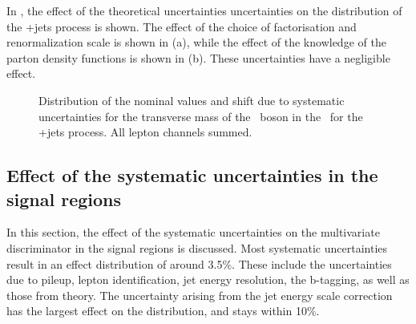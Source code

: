 \newpage
In , the effect of the theoretical uncertainties uncertainties on the distribution of the \WZ+jets process is shown. The effect of the choice of factorisation and renormalization scale is shown in  (a), while the effect of the knowledge of the parton density functions is shown in  (b). These uncertainties have a negligible effect. 
\begin{figure}[htbp] 
	\centering 

	\caption{Distribution of the nominal values and shift due to  systematic uncertainties for the transverse mass of the \PW\ boson in the \WZCR\ for the \WZ+jets process. All lepton channels summed.}
	\label{fig:shiftMTWt}
\end{figure}


\subsection{Effect of the systematic uncertainties in the signal regions}
\label{sec:BDTsys}
In this section, the effect of the systematic uncertainties on the multivariate discriminator in the signal regions is discussed.  Most systematic uncertainties result in an effect distribution of around 3.5\%. These include the uncertainties due to pileup,  lepton identification, jet energy resolution, the b-tagging, as well as those from theory. The uncertainty arising from the jet energy scale correction has the largest effect on the distribution, and stays within 10\%. 



